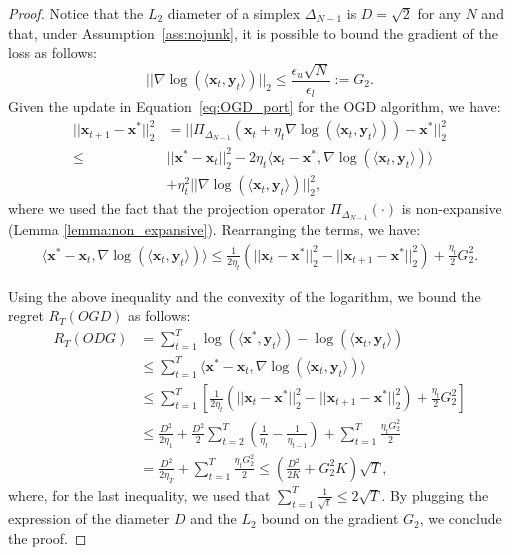 \begin{proof}
Notice that the $L_2$ diameter of a simplex $\Delta_{N-1}$ is $D = \sqrt{2}$ for any $N$ and that, under Assumption~\ref{ass:nojunk}, it is possible to bound the gradient of the loss as follows:
\begin{equation} \label{eq:bounded_gradient}
    ||\nabla \log (\langle \mathbf{x}_t, \mathbf{y}_t \rangle)||_2 \leq \frac{\epsilon_u \sqrt{N}}{\epsilon_l}:=G_2.
\end{equation}
Given the update in Equation~\eqref{eq:OGD_port} for the OGD algorithm, we have:
\begin{align}
     ||\mathbf{x}_{t+1} - \mathbf{x}^*||_2^2 &= ||\Pi_{\Delta_{N-1}}(\mathbf{x}_t + \eta_t \nabla \log(\langle \mathbf{x}_t, \mathbf{y}_t \rangle)) - \mathbf{x}^*||_2^2 \nonumber\\
    \leq & ||\mathbf{x}^* - \mathbf{x}_t||_2^2-2\eta_t\langle \mathbf{x}_t-\mathbf{x}^*,\nabla \log( \langle \mathbf{x}_t, \mathbf{y}_t \rangle) \rangle \nonumber \\ 
    & + \eta_t^2||\nabla \log( \langle \mathbf{x}_t, \mathbf{y}_t \rangle)||_2^2, \label{eq:magic}
\end{align}
where we used the fact that the projection operator $\Pi_{\Delta_{N-1}}(\cdot)$ is non-expansive (Lemma \ref{lemma:non_expansive}).
Rearranging the terms, we have:
\begin{align*}
    \langle \mathbf{x}^*-\mathbf{x}_t, \nabla \log (\langle \mathbf{x}_t, \mathbf{y}_t \rangle)\rangle\le \frac{1}{2\eta_t}\left( ||\mathbf{x}_t-\mathbf{x}^*||_2^2-||\mathbf{x}_{t+1}-\mathbf{x}^*||_2^2\right) + \frac{\eta_t}{2}G_2^2.
\end{align*}

Using the above inequality and the convexity of the logarithm, we bound the regret $R_T(OGD)$ as follows:
\begin{align*}
     R_T (ODG) &= \sum\limits_{t=1}^T\log (\langle \mathbf{x}^*, \mathbf{y}_t \rangle)-\log (\langle \mathbf{x}_t, \mathbf{y}_t \rangle) \\
    & \le\sum\limits_{t=1}^T\langle\mathbf{x}^*-\mathbf{x}_t,\nabla \log (\langle \mathbf{x}_t, \mathbf{y}_t \rangle)\rangle\\
    &\le\sum\limits_{t=1}^T\left[\frac{1}{2\eta_t}\left(||\mathbf{x}_t-\mathbf{x}^*||_2^2-||\mathbf{x}_{t+1}-\mathbf{x}^*||_2^2\right)+\frac{\eta_t}{2}G_2^2\right]\\
    &\le \frac{D^2}{2\eta_1}+\frac{D^2}{2}\sum\limits_{t=2}^{T}\left(\frac{1}{\eta_t}-\frac{1}{\eta_{t-1}}\right)+\sum\limits_{t=1}^T\frac{\eta_t G_2^2}{2}\\
    &=\frac{D^2}{2\eta_T}+\sum\limits_{t=1}^T\frac{\eta_tG_2^2}{2} \le \left(\frac{D^2}{2K}+G_2^2K\right)\sqrt{T},
\end{align*}
where, for the last inequality, we used that $\sum_{t=1}^T \frac{1}{\sqrt{t}} \leq 2 \sqrt{T}$.
By plugging the expression of the diameter $D$ and the $L_2$ bound on the gradient $G_2$, we conclude the proof.
\end{proof}

